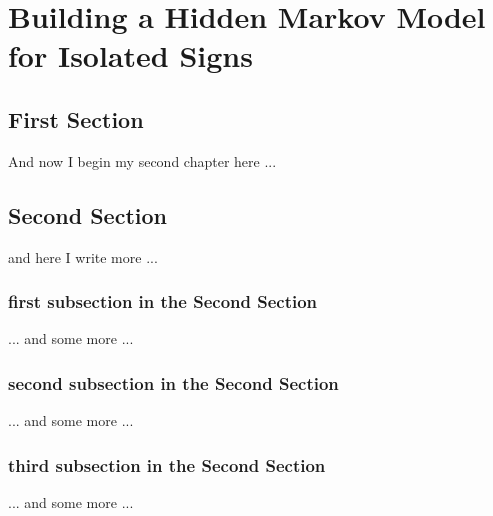 \chapter{Building a Hidden Markov Model for Isolated Signs}
\ifpdf
    \graphicspath{{Chapter2/Chapter2Figs/PNG/}{Chapter2/Chapter2Figs/PDF/}{Chapter2/Chapter2Figs/}}
\else
    \graphicspath{{Chapter2/Chapter2Figs/EPS/}{Chapter2/Chapter2Figs/}}
\fi

\section{First Section}
And now I begin my second chapter here ...

\section{Second Section}
and here I write more ...

\subsection{first subsection in the Second Section}
... and some more ...

\subsection{second subsection in the Second Section}
... and some more ...

\subsection{third subsection in the Second Section}
... and some more ...


